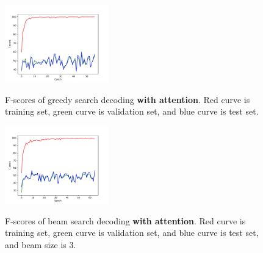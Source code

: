 \documentclass[11pt,a4paper]{article}
\begin{document}
\begin{figure}[h]
\caption{F-scores of greedy search decoding \textbf{with attention}. Red curve is training set, green curve is validation set, and blue curve is test set.}
\centering
\includegraphics[width=0.4\textwidth]{fig_lrn_0p001_atten_f.pdf}
\label{fig:attn_losses_fscore}
\end{figure}


\begin{figure}[h]
\caption{F-scores of beam search decoding \textbf{with attention}. Red curve is training set, green curve is validation set, and blue curve is test set, and beam size is 3.}
\centering
\includegraphics[width=0.4\textwidth]{fig_lrn_0p001_beam_3_atten_f.pdf}
\label{fig:beam3_attn_losses_fscore}
\end{figure}



\end{document}
